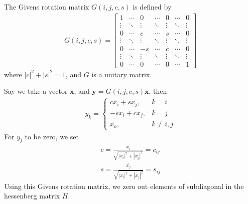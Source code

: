 \documentclass{beamer}
\providecommand{\brak}[1]{\ensuremath{\left(#1\right)}}
\theoremstyle{remark}
\providecommand{\abs}[1]{\left\vert#1\right\vert}
\let\vec\mathbf
\numberwithin{equation}{section}
\begin{document}
\begin{frame}
The Givens rotation matrix $G\brak{i, j, c, s}$ is defined by
\begin{align}
G\brak{i, j, c, s} = \begin{bmatrix}
1 & \cdots & 0 & \cdots & 0 & \cdots & 0 \\
\vdots & \ddots & \vdots & \ddots & \vdots & \ddots & \vdots \\
0 & \cdots & c & \cdots & s & \cdots & 0 \\
\vdots & \ddots & \vdots & \ddots & \vdots & \ddots & \vdots \\
0 & \cdots & -\overline{s} & \cdots & \overline{c} & \cdots & 0 \\
\vdots & \ddots & \vdots & \ddots & \vdots & \ddots & \vdots \\
0 & \cdots & 0 & \cdots & 0 & \cdots & 1
\end{bmatrix}
\end{align}
where $\abs{c}^2 + \abs{s}^2 = 1$, and $G$ is a unitary matrix.
\end{frame}

\begin{frame}
Say we take a vector $\vec{x}$, and $\vec{y} = G\brak{i, j, c, s}\vec{x}$, then
\begin{align}
    y_k = \begin{cases}
        c x_i + s x_j, & k = i \\
        -\overline{s} x_i + \overline{c} x_j, & k = j \\
        x_k, & k \neq i, j
    \end{cases}
\end{align}
For $y_j$ to be zero, we set
\begin{align}
    c = \frac{\overline{x_i}}{\sqrt{\abs{x_i}^2 + \abs{x_j}^2}} = c_{ij}\\
    s = \frac{\overline{x_j}}{\sqrt{\abs{x_i}^2 + \abs{x_j}^2}} = s_{ij}
\end{align}
Using this Givens rotation matrix, we zero out elements of subdiagonal in the hessenberg matrix $H$.
\end{frame}
\end{document}
